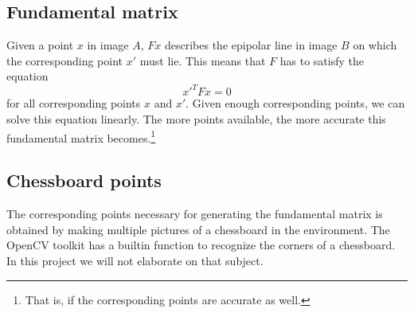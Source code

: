 \documentclass[a4paper]{article}
\begin{document}
\subsection{Fundamental matrix}
Given a point $x$ in image $A$, $Fx$ describes the epipolar line in image
$B$ on which the corresponding point $x'$ must lie. This means that $F$ has to
satisfy the equation
\[ x'^{T}Fx = 0 \]
for all corresponding points $x$ and $x'$. Given enough corresponding points, we
can solve this equation linearly. The more points available, the more accurate
this fundamental matrix becomes.\footnote{That is, if the corresponding points
are accurate as well.}

\subsection{Chessboard points}
The corresponding points necessary for generating the fundamental matrix is
obtained by making multiple pictures of a chessboard in the environment. The
OpenCV toolkit has a builtin function to recognize the corners of a chessboard.
In this project we will not elaborate on that subject.
\end{document}
